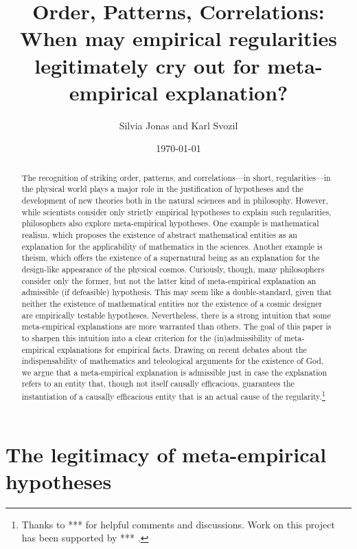 \documentclass[a4paper,12pt]{article}
\title{Order, Patterns, Correlations: When may empirical regularities legitimately cry out for meta-empirical explanation?}
\author{Silvia Jonas and Karl Svozil}
\date{\today}
\begin{document}
\maketitle

\renewcommand{\abstractname}{Abstract}

\begin{abstract}
\footnotesize
\singlespacing

The recognition of striking order, patterns, and correlations---in short, regularities---in the physical world plays a major role in the justification of hypotheses and the development of new theories both in the natural sciences and in philosophy. However, while scientists consider only strictly empirical hypotheses to explain such regularities, philosophers also explore meta-empirical hypotheses. One example is mathematical realism, which proposes the existence of abstract mathematical entities as an explanation for the applicability of mathematics in the sciences. Another example is theism, which offers the existence of a supernatural being as an explanation for the design-like appearance of the physical cosmos. Curiously, though, many philosophers consider only the former, but not the latter kind of meta-empirical explanation an admissible (if defeasible) hypothesis. This may seem like a double-standard, given that neither the existence of mathematical entities nor the existence of a cosmic designer are empirically testable hypotheses. Nevertheless, there is a strong intuition that some meta-empirical explanations are more warranted than others. The goal of this paper is to sharpen this intuition into a clear criterion for the (in)admissibility of meta-empirical explanations for empirical facts. Drawing on recent debates about the indispensability of mathematics and teleological arguments for the existence of God, we argue that a meta-empirical explanation is admissible just in case the explanation refers to an entity that, though not itself causally efficacious, guarantees the instantiation of a causally efficacious entity that is an actual cause of the regularity.\footnote{Thanks to *** for helpful comments and discussions. Work on this project has been supported by *** .}
\end{abstract}

\section{The legitimacy of meta-empirical hypotheses}
\end{document}
